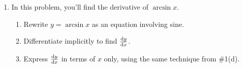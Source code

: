\documentclass[main]{subfiles}
\begin{document}
\begin{enumerate}
\begin{enumerate}[resume]
  \end{enumerate}

\item 
  \begin{problem}
    In this problem, you'll find the derivative of $\arcsin x$.
    \begin{enumerate}[topsep=0pt]
      \item 
        \begin{problem}[0.5in]
        Rewrite $y=\arcsin x$ as an equation involving sine.
        \end{problem}

      \item
        \begin{problem}[0.75in]
        Differentiate implicitly to find $\diff yx$.
        \end{problem}

    \item
      \begin{problem}[1.5in]
      Express $\diff yx$ in terms of $x$ only, using the same technique from \#1(d).
      \end{problem}
    \end{enumerate}
  \end{problem}


\end{enumerate}
\end{document}
